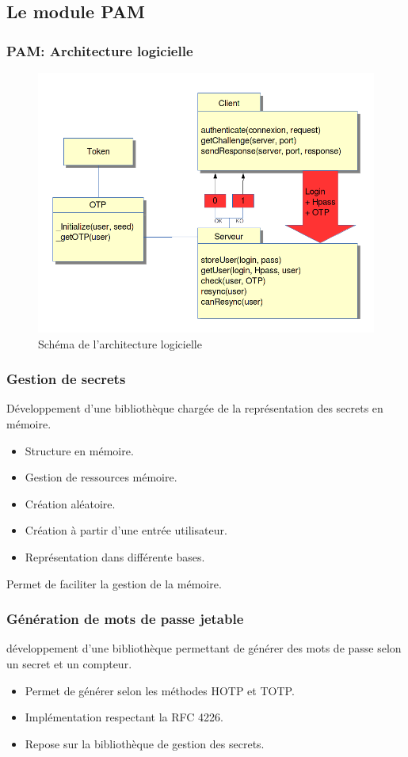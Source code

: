 \documentclass[xcolor=table]{beamer}
\begin{document}
\subsection{Le module PAM}
\begin{frame}
\frametitle{PAM: Architecture logicielle}
\begin{figure}
 \includegraphics[scale=0.3]{../graphics/architecture.png} 
 \caption{Schéma de l'architecture logicielle}
\end{figure}

\end{frame}
\begin{frame}
\frametitle{Gestion de secrets}
Développement d'une bibliothèque chargée de la représentation des secrets en mémoire.
\begin{itemize}
  \item Structure en mémoire.
  \item Gestion de ressources mémoire.
  \item Création aléatoire.
  \item Création à partir d'une entrée utilisateur.
  \item Représentation dans différente bases.
\end{itemize}

Permet de faciliter la gestion de la mémoire.
\end{frame}

\begin{frame}
\frametitle{Génération de mots de passe jetable}
développement d'une bibliothèque permettant de générer des mots de passe selon un secret
et un compteur.
\begin{itemize}
\item Permet de générer selon les méthodes HOTP et TOTP.
\item Implémentation respectant la RFC 4226.
\item Repose sur la bibliothèque de gestion des secrets.
\end{itemize}

\end{frame}
\end{document}
